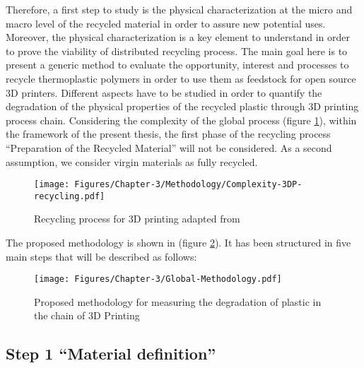 Therefore,  a first step to study is the physical characterization at the micro and macro level of the recycled material in order to assure new potential uses.
Moreover, the physical characterization is a key element to understand in order to prove the viability of distributed recycling process.
The main goal here is to present a generic method to evaluate the opportunity, interest and processes to recycle thermoplastic polymers in order to use them as feedstock for open source 3D printers. 
Different aspects have to be studied in order to quantify the degradation of the physical properties of the recycled plastic through 3D printing process chain.
Considering the complexity of the global process  (figure \ref{Complexity.3DP.recycling}), within the framework of the present thesis, the first phase of the recycling process ``Preparation of the Recycled Material'' will not be considered. 
As a second assumption, we consider virgin materials as fully recycled. 



\begin{figure}[!htb]
	\centering
	\texttt{[image: Figures/Chapter-3/Methodology/Complexity-3DP-recycling.pdf]}
	\caption{ Recycling process for 3D printing adapted from \parencite{Aznar2006} }
	\label{Complexity.3DP.recycling}
\end{figure}

The proposed methodology is shown in (figure \ref{Methodology}). It has been structured in five main steps that will be described as follows: %



\begin{center}
\begin{figure}[p]
	\centering
	\texttt{[image: Figures/Chapter-3/Global-Methodology.pdf]}
	\caption{Proposed methodology for measuring the degradation of plastic in the chain of 3D Printing}
	\label{Methodology}
\end{figure}
\end{center}
\newpage

\subsection{ Step 1 ``Material definition''}

